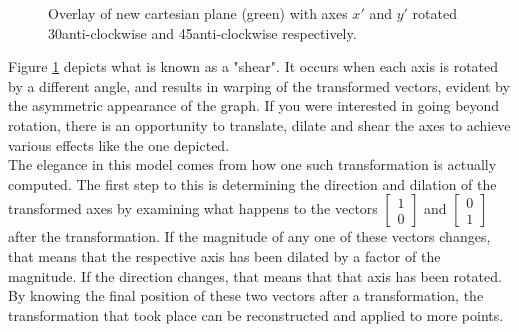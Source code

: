 \documentclass[12pt, a4paper]{article}
\begin{document}
\begin{figure}[H]
    \caption{ Overlay of new cartesian plane (green) with axes $x'$ and $y'$
        rotated 30\textdegree\space anti-clockwise and 45\textdegree\space anti-clockwise respectively. }
    \label{2d_axis_shear}
\end{figure}

Figure \ref{2d_axis_shear} depicts what is known as a "shear". It occurs when
each axis is rotated by a different angle, and results in warping of the
transformed vectors, evident by the asymmetric appearance of the graph. If you
were interested in going beyond rotation, there is an opportunity to translate,
dilate and shear the axes to achieve various effects like the one depicted.\\

The elegance in this model comes from how one such transformation is actually
computed. The first step to this is determining the direction and dilation of the
transformed axes by examining what happens to the vectors $\begin{bmatrix} 1 \\
        0\end{bmatrix}$ and $\begin{bmatrix} 0 \\
        1\end{bmatrix}$ after the transformation. If the magnitude of any one of these
vectors changes, that means that the respective axis has been dilated by a
factor of the magnitude. If the direction changes, that means that that axis has
been rotated. By knowing the final position of these two vectors after a
transformation, the transformation that took place can be reconstructed and
applied to more points. \\
\end{document}
